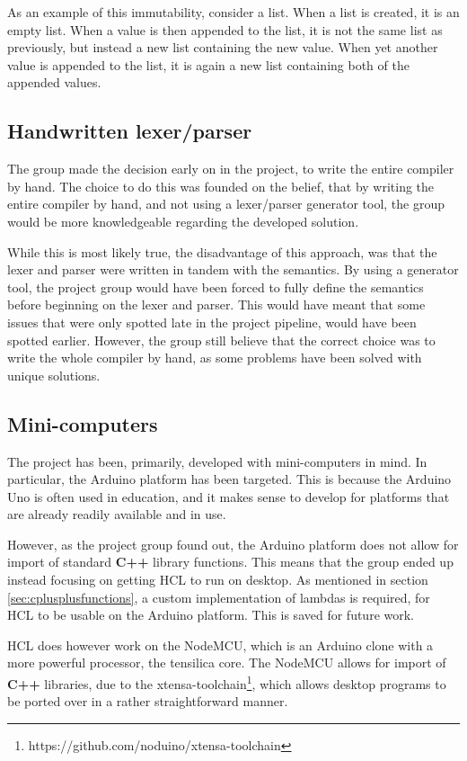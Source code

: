 As an example of this immutability, consider a list.
When a list is created, it is an empty list.
When a value is then appended to the list, it is not the same list as previously, but instead a new list containing the new value.
When yet another value is appended to the list, it is again a new list containing both of the appended values.

\subsection{Handwritten lexer/parser}
The group made the decision early on in the project, to write the entire compiler by hand.
The choice to do this was founded on the belief, that by writing the entire compiler by hand, and not using a lexer/parser generator tool, the group would be more knowledgeable regarding the developed solution.

While this is most likely true, the disadvantage of this approach, was that the lexer and parser were written in tandem with the semantics.
By using a generator tool, the project group would have been forced to fully define the semantics before beginning on the lexer and parser.
This would have meant that some issues that were only spotted late in the project pipeline, would have been spotted earlier.
However, the group still believe that the correct choice was to write the whole compiler by hand, as some problems have been solved with unique solutions.

\subsection{Mini-computers}
The project has been, primarily, developed with mini-computers in mind.
In particular, the Arduino platform has been targeted.
This is because the Arduino Uno is often used in education, and it makes sense to develop for platforms that are already readily available and in use.

However, as the project group found out, the Arduino platform does not allow for import of standard \textbf{C++} library functions.
This means that the group ended up instead focusing on getting HCL to run on desktop.
As mentioned in section \ref{sec:cplusplusfunctions}, a custom implementation of lambdas is required, for HCL to be usable on the Arduino platform.
This is saved for future work.

HCL does however work on the NodeMCU, which is an Arduino clone with a more powerful processor, the tensilica core.
The NodeMCU allows for import of \textbf{C++} libraries, due to the xtensa-toolchain\footnote{https://github.com/noduino/xtensa-toolchain}, which allows desktop programs to be ported over in a rather straightforward manner.


